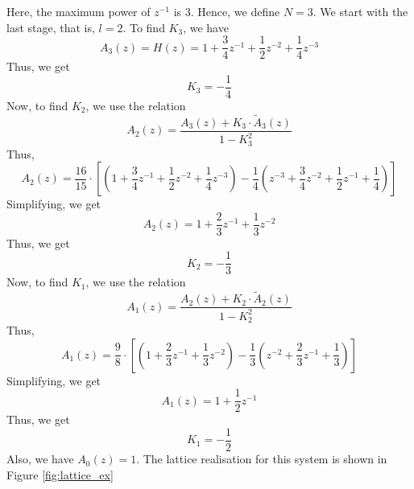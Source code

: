 \documentclass{article}
\theoremstyle{definition}
\begin{document}
Here, the maximum power of $z^{-1}$ is $3$. Hence, we define $N=3$. We start with the last stage, that is, $l=2$. To find $K_3$, we have 
\[
    A_3(z) = H(z) = 1 + \frac{3}{4}z^{-1} +\frac{1}{2}z^{-2} + \frac{1}{4} z^{-3}
\]
Thus, we get 
\[
    \boxed{K_3 = - \frac{1}{4}}
\]
Now, to find $K_2$, we use the relation 
\[
    A_2(z) = \frac{A_3(z) + K_3 \cdot \widetilde{A}_{3}(z)}{1 - K_3^2}
\]
Thus, 
\[
    A_2(z) = \frac{16}{15} \cdot \left[ \left( 1 + \frac{3}{4}z^{-1} +\frac{1}{2}z^{-2} + \frac{1}{4} z^{-3}\right) - \frac{1}{4} \left( z^{-3} + \frac{3}{4}z^{-2} +\frac{1}{2}z^{-1} + \frac{1}{4}\right) \right]
\]
Simplifying, we get 
\[
    A_2(z) = 1 + \frac{2}{3} z^{-1} + \frac{1}{3} z^{-2}
\]
Thus, we get 
\[
    \boxed{K_2 = - \frac{1}{3}}
\]
Now, to find $K_1$, we use the relation
\[
    A_1(z) = \frac{A_2(z) + K_2 \cdot \widetilde{A}_{2}(z)}{1 - K_2^2}
\]  
Thus, 
\[
    A_1(z) = \frac{9}{8} \cdot \left[\left( 1 + \frac{2}{3} z^{-1} + \frac{1}{3} z^{-2}\right) - \frac{1}{3} \left(z^{-2} + \frac{2}{3} z^{-1} + \frac{1}{3} \right) \right]
\]
Simplifying, we get
\[
    A_1(z) = 1 + \frac{1}{2} z^{-1}
\]
Thus, we get 
\[
    \boxed{K_1 = - \frac{1}{2}}
\]
Also, we have $A_0(z) = 1$. The lattice realisation for this system is shown in Figure \ref{fig:lattice_ex}
\end{document}
